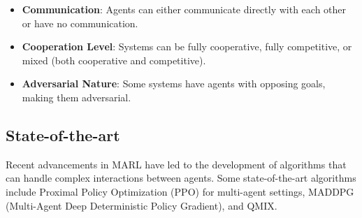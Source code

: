 \begin{itemize}
    \item \textbf{Communication}: Agents can either communicate directly with each other or have no communication.
    \item \textbf{Cooperation Level}: Systems can be fully cooperative, fully competitive, or mixed (both cooperative and competitive).
    \item \textbf{Adversarial Nature}: Some systems have agents with opposing goals, making them adversarial.
\end{itemize}

\subsection{State-of-the-art}
Recent advancements in MARL have led to the development of algorithms that can handle complex interactions between agents. Some state-of-the-art algorithms include Proximal Policy Optimization (PPO) for multi-agent settings, MADDPG (Multi-Agent Deep Deterministic Policy Gradient), and QMIX.

